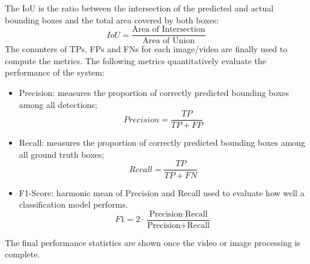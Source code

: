 The IoU is the ratio between the intersection of the predicted and actual bounding boxes and the total area covered by both boxes:
\[ IoU = \frac{\text{Area of Intersection}}{\text{Area of Union}} \]
The conunters of TPs, FPs and FNs for each image/video are finally used to compute the metrics. The following metrics quantitatively evaluate the performance of the system:
\begin{itemize}
    \item Precision: measures the proportion of correctly predicted bounding boxes among all detections;
    \[ Precision = \frac{TP}{TP + FP} \]
    \item Recall: measures the proportion of correctly predicted bounding boxes among all ground truth boxes;
    \[ Recall = \frac{TP}{TP + FN} \]
    \item F1-Score: harmonic mean of Precision and Recall used to evaluate how well a classification model performs.
    \[  F1 = 2 \cdot \frac{\text{Precision} \cdot \text{Recall}}{\text{Precision} + \text{Recall}} \]
\end{itemize}
The final performance statistics are shown once the video or image processing is complete.